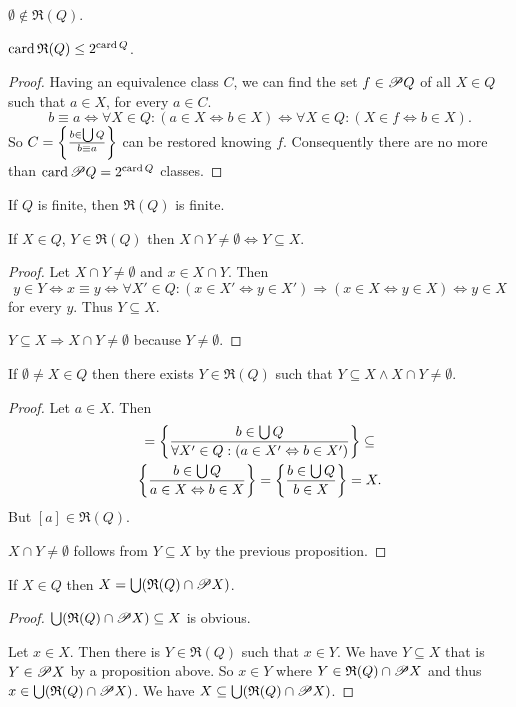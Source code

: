 \begin{obvious}
$\emptyset\notin\mathfrak{R}(Q)$.\end{obvious}
\begin{lem}
$\operatorname{card}\mathfrak{R}(Q)\leq2^{\operatorname{card} Q}$.\end{lem}
\begin{proof}
Having an equivalence class $C$, we can find the set $f\in\mathscr{P} Q$
of all $X\in Q$ such that $a\in X$, for every $a\in C$. 
\[
b\equiv a\Leftrightarrow\forall X\in Q:(a\in X\Leftrightarrow b\in X)\Leftrightarrow\forall X\in Q:(X\in f\Leftrightarrow b\in X).
\]
So $C=\left\{ \frac{b\in\bigcup Q}{b\equiv a}\right\}$ can be restored knowing
$f$. Consequently there are no more than $\operatorname{card}\mathscr{P} Q=2^{\operatorname{card} Q}$
classes.\end{proof}
\begin{cor}
If $Q$ is finite, then $\mathfrak{R}(Q)$ is finite.\end{cor}
\begin{prop}
If $X\in Q$, $Y\in\mathfrak{R}(Q)$ then $X\cap Y\neq\emptyset\Leftrightarrow Y\subseteq X$.\end{prop}
\begin{proof}
Let $X\cap Y\neq\emptyset$ and $x\in X\cap Y$. Then 
\[
y\in Y\Leftrightarrow x\equiv y\Leftrightarrow\forall X'\in Q:(x\in X'\Leftrightarrow y\in X')\Rightarrow(x\in X\Leftrightarrow y\in X)\Leftrightarrow y\in X
\]
 for every $y$. Thus $Y\subseteq X$.

$Y\subseteq X\Rightarrow X\cap Y\neq\emptyset$ because $Y\neq\emptyset$.\end{proof}
\begin{prop}
If $\emptyset\neq X\in Q$ then there exists $Y\in\mathfrak{R}(Q)$
such that $Y\subseteq X\wedge X\cap Y\neq\emptyset$.\end{prop}
\begin{proof}
Let $a\in X$. Then 
\begin{multline*}
[a]=\setcond{b\in\bigcup Q}{\forall X'\in Q:(a\in X'\Leftrightarrow b\in X')}\subseteq\\
\setcond{b\in\bigcup Q}{a\in X\Leftrightarrow b\in X} = \setcond{b\in\bigcup Q}{b\in X}=X.
\end{multline*}
But $[a]\in\mathfrak{R}(Q)$.

$X\cap Y\neq\emptyset$ follows from $Y\subseteq X$ by the previous
proposition.\end{proof}
\begin{prop}
If $X\in Q$ then $X=\bigcup(\mathfrak{R}(Q)\cap\mathscr{P} X)$.\end{prop}
\begin{proof}
$\bigcup(\mathfrak{R}(Q)\cap\mathscr{P} X)\subseteq X$ is obvious.

Let $x\in X$. Then there is $Y\in\mathfrak{R}(Q)$ such that $x\in Y$.
We have $Y\subseteq X$ that is $Y\in\mathscr{P} X$ by a proposition
above. So $x\in Y$ where $Y\in\mathfrak{R}(Q)\cap\mathscr{P} X$ and
thus $x\in\bigcup(\mathfrak{R}(Q)\cap\mathscr{P} X)$. We have $X\subseteq\bigcup(\mathfrak{R}(Q)\cap\mathscr{P} X)$.
\end{proof}


